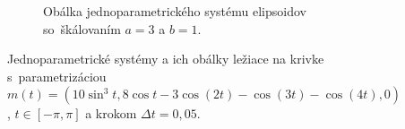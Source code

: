 \documentclass[12pt, twoside]{book}
\begin{document}
\begin{figure}[h]
\begin{subfigure}[t]{0.4\textwidth}
        	\caption{Obálka jednoparametrického systému elipsoidov so~škálovaním $a=3$ a $b=1$.}
        \label{fig:plocha14}
    \end{subfigure}
    \caption[Katalóg vytlačených plôch III.]{Jednoparametrické systémy a ich obálky ležiace na krivke s~parametrizáciou $m(t)=(10\sin^{3}t, 8 \cos t-3\cos(2t) -\cos(3t)-\cos (4t), 0)$, $t \in [-\pi, \pi]$ a krokom $\Delta t = 0,05.$}
    \label{fig:katalogIII}
\end{figure}
\end{document}
